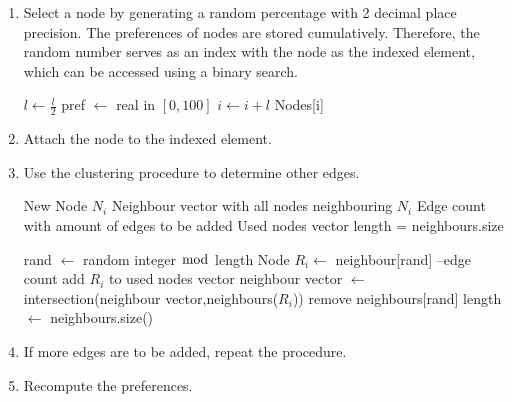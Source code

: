 \documentclass[a4paper,11pt,titlepage]{article}
\begin{document}
\begin{enumerate}
  \item
    Select a node by generating a random percentage with 2 decimal place
    precision. The preferences of nodes are stored cumulatively. Therefore, the
    random number serves as an index with the node as the indexed element, which
    can be accessed using a binary search.

    \begin{algorithmic}
	        \STATE $l \gets \frac{l}{2}$
		        \STATE pref $\gets$ real in  $[0,100]$
		          \STATE $i \gets i+l$
		        \ENDIF
	        \ENDIF
	      \ENDWHILE
      \ENDFOR
      \RETURN Nodes[i]
    \end{algorithmic}

   \item
     Attach the node to the indexed element.

   \item
     Use the clustering procedure to determine other edges.

     \begin{algorithmic}
       \REQUIRE New Node $N_i$
       \REQUIRE Neighbour vector with all nodes neighbouring $N_i$
       \REQUIRE Edge count with amount of edges to be added
       \REQUIRE Used nodes vector
       \STATE length = neighbours.size

	       \STATE rand $\gets$ random integer $\bmod$ length
	       \STATE Node $R_i \gets$ neighbour[rand]
		       \STATE --edge count
		       \STATE add $R_i$ to used nodes vector
		       \STATE neighbour vector $\gets$ intersection(neighbour vector,neighbours($R_i$))
	       \ELSE
		       \STATE remove neighbours[rand]
	       \ENDIF
	       \STATE length $\gets$ neighbours.size()
       \ENDWHILE
     \end{algorithmic}

   \item
     If more edges are to be added, repeat the procedure.

   \item
     Recompute the preferences.
\end{enumerate}
\end{document}
